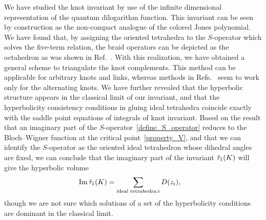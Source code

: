 \documentclass[12pt]{article}
\numberwithin{equation}{section}
\renewcommand{\Im}{\text{Im}}
\begin{document}
We have studied the knot invariant
by use of the infinite dimensional representation of the quantum
dilogarithm function.
This invariant can be seen
by construction  as the non-compact analogue
of the colored Jones polynomial.
We  have found  that,
by assigning the oriented tetrahedra to the $S$-operator
which solves the five-term relation,
the braid operators can be  depicted  as the octahedron as was
shown  in Ref.~.
With this realization,
we have obtained a general scheme to triangulate the knot complements.
This method can be applicable   for arbitrary knots and links, whereas
methods in Refs.~ seem to  work 
only  for the
alternating knots.
We have further
revealed that the hyperbolic structure appears   in the
classical limit of our invariant, and that
the hyperbolicity consistency
conditions in gluing ideal tetrahedra  coincide exactly
with the saddle point  equations of integrals of knot invariant.
Based on the result  that
an imaginary part of the
$S$-operator~\eqref{define_S_operator}
reduces to the Bloch--Wigner function at the critical
point~\eqref{property_V},
and that we can identify the $S$-operator as the oriented ideal
tetrahedron whose dihedral angles are  fixed,
we  can  conclude that the imaginary part of the invariant
$\Tilde{\tau}_1(K)$  will give the hyperbolic volume
\begin{align*}
%
  \Im \, \Tilde{\tau}_1(K)
  &=
  \sum_{\text{ideal tetrahedra}:  i}
  D(z_i) ,
\end{align*}
though we are not sure which solutions of a set of the hyperbolicity
conditions are dominant in the classical limit.
\end{document}
